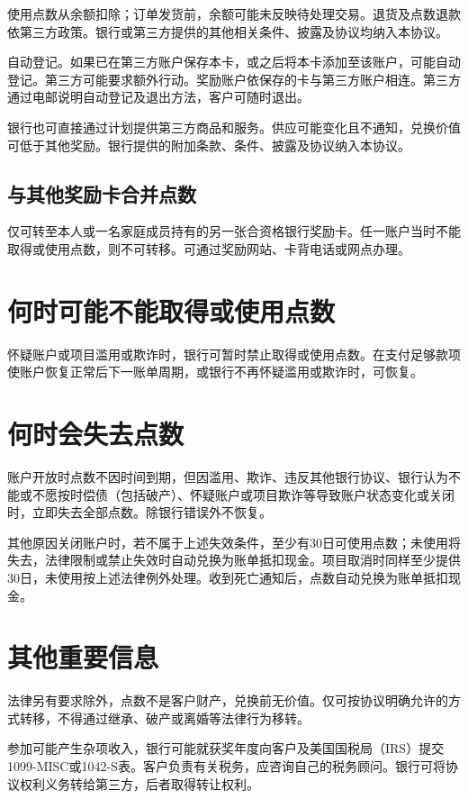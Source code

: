 \documentclass[UTF8,fontset=none,11pt,a4paper]{ctexart}
\begin{document}
使用点数从余额扣除；订单发货前，余额可能未反映待处理交易。退货及点数退款依第三方政策。银行或第三方提供的其他相关条件、披露及协议均纳\allowbreak\mbox{入本协议。}


自动登记。如果已在第三方账户保存本卡，或之后将本卡添加至该账户，可能自动登记。第三方可能要求额外行动。奖励账户依保存的卡与第三方账户相连。第三方通过电邮说明自动登记及退出方法，客户可\allowbreak\mbox{随时退出。}


银行也可直接通过计划提供第三方商品和服务。供应可能变化且不通知，兑换价值可低于其他奖励。银行提供的附加条款、条件、披露及协议纳\allowbreak\mbox{入本协议。}


\subsection*{与其他奖励卡合并点数}
仅可转至本人或一名家庭成员持有的另一张合资格银行奖励卡。任一账户当时不能取得或使用点数，则不可转移。可通过奖励网站、卡背电话或\allowbreak\mbox{网点办理。}


\section*{何时可能不能取得或使用点数}
怀疑账户或项目滥用或欺诈时，银行可暂时禁止取得或使用点数。在支付足够款项使账户恢复正常后下一账单周期，或银行不再怀疑滥用或欺诈时，可恢复。


\section*{何时会失去点数}
账户开放时点数不因时间到期，但因滥用、欺诈、违反其他银行协议、银行认为不能或不愿按时偿债（包括破产）、怀疑账户或项目欺诈等导致账户状态变化或关闭时，立即失去全部点数。除银行错误\allowbreak\mbox{外不恢复。}


其他原因关闭账户时，若不属于上述失效条件，至少有30日可使用点数；未使用将失去，法律限制或禁止失效时自动兑换为账单抵扣现金。项目取消时同样至少提供30日，未使用按上述法律例外处理。收到死亡通知后，点数自动兑换为账单\allowbreak\mbox{抵扣现金。}


\section*{其他重要信息}
法律另有要求除外，点数不是客户财产，兑换前无价值。仅可按协议明确允许的方式转移，不得通过继承、破产或离婚等法律\allowbreak\mbox{行为移转。}


参加可能产生杂项收入，银行可能就获奖年度向客户及美国国税局（IRS）提交1099-MISC或1042-S表。客户负责有关税务，应咨询自己的税务顾问。银行可将协议权利义务转给第三方，后者取得转\allowbreak\mbox{让权利。}
\end{document}
